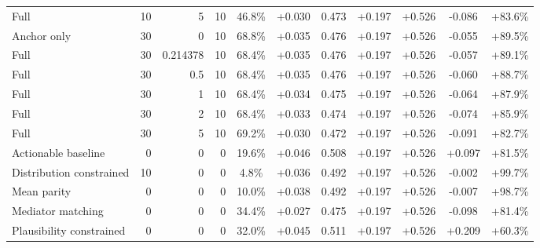 \begin{table}[htbp]
\begin{tabular}{lrrrccccccc}
Full & 10 & 5 & 10 & 46.8\% & +0.030 & 0.473 & +0.197 & +0.526 & -0.086 & +83.6\% \\
Anchor only & 30 & 0 & 10 & 68.8\% & +0.035 & 0.476 & +0.197 & +0.526 & -0.055 & +89.5\% \\
Full & 30 & 0.214378 & 10 & 68.4\% & +0.035 & 0.476 & +0.197 & +0.526 & -0.057 & +89.1\% \\
Full & 30 & 0.5 & 10 & 68.4\% & +0.035 & 0.476 & +0.197 & +0.526 & -0.060 & +88.7\% \\
Full & 30 & 1 & 10 & 68.4\% & +0.034 & 0.475 & +0.197 & +0.526 & -0.064 & +87.9\% \\
Full & 30 & 2 & 10 & 68.4\% & +0.033 & 0.474 & +0.197 & +0.526 & -0.074 & +85.9\% \\
Full & 30 & 5 & 10 & 69.2\% & +0.030 & 0.472 & +0.197 & +0.526 & -0.091 & +82.7\% \\
Actionable baseline & 0 & 0 & 0 & 19.6\% & +0.046 & 0.508 & +0.197 & +0.526 & +0.097 & +81.5\% \\
Distribution constrained & 10 & 0 & 0 & 4.8\% & +0.036 & 0.492 & +0.197 & +0.526 & -0.002 & +99.7\% \\
Mean parity & 0 & 0 & 0 & 10.0\% & +0.038 & 0.492 & +0.197 & +0.526 & -0.007 & +98.7\% \\
Mediator matching & 0 & 0 & 0 & 34.4\% & +0.027 & 0.475 & +0.197 & +0.526 & -0.098 & +81.4\% \\
Plausibility constrained & 0 & 0 & 0 & 32.0\% & +0.045 & 0.511 & +0.197 & +0.526 & +0.209 & +60.3\% \\
\bottomrule
\end{tabular}
\end{table}